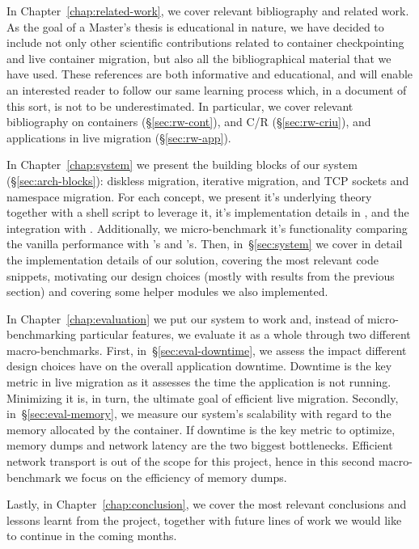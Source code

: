 In Chapter~\ref{chap:related-work}, we cover relevant bibliography and related
work.
As the goal of a Master's thesis is educational in nature, we have decided to
include not only other scientific contributions related to container
checkpointing and live container migration, but also all the bibliographical
material that we have used.
These references are both informative and educational, and will enable an
interested reader to follow our same learning process which, in a document of
this sort, is not to be underestimated.
In particular, we cover relevant bibliography on containers
(\S\ref{sec:rw-cont}), \criu and C/R (\S\ref{sec:rw-criu}), and applications in
live migration (\S\ref{sec:rw-app}).

In Chapter~\ref{chap:system} we present the building blocks of our system
(\S\ref{sec:arch-blocks}): diskless migration, iterative migration, and TCP
sockets and namespace migration.
For each concept, we present it's underlying theory together with a shell
script to leverage it, it's implementation details in \criu, and the
integration with \runc.
Additionally, we micro-benchmark it's functionality comparing the vanilla
performance with \criu's and \runc's.
Then, in~\S\ref{sec:system} we cover in detail the implementation details of
our solution, covering the most relevant code snippets, motivating our design
choices (mostly with results from the previous section) and covering some
helper modules we also implemented.

In Chapter~\ref{chap:evaluation} we put our system to work and, instead of
micro-benchmarking particular features, we evaluate it as a whole through two
different macro-benchmarks.
First, in~\S\ref{sec:eval-downtime}, we assess the impact different design
choices have on the overall application downtime.
Downtime is the key metric in live migration as it assesses the time the
application is not running.
Minimizing it is, in turn, the ultimate goal of efficient live migration.
Secondly, in~\S\ref{sec:eval-memory}, we measure our system's scalability with
regard to the memory allocated by the container.
If downtime is the key metric to optimize, memory dumps and network latency are
the two biggest bottlenecks.
Efficient network transport is out of the scope for this project, hence in this
second macro-benchmark we focus on the efficiency of memory dumps.

Lastly, in Chapter~\ref{chap:conclusion}, we cover the most relevant
conclusions and lessons learnt from the project, together with future lines of
work we would like to continue in the coming months.
